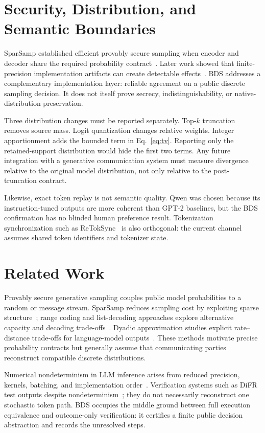 \documentclass[sigconf,review,nonacm]{acmart}
\begin{document}


\section{Security, Distribution, and Semantic Boundaries}
SparSamp established efficient provably secure sampling when encoder and decoder share the required probability contract~\cite{wang2025sparsamp}. Later work showed that finite-precision implementation artifacts can create detectable effects~\cite{cao2026finite}. BDS addresses a complementary implementation layer: reliable agreement on a public discrete sampling decision. It does not itself prove secrecy, indistinguishability, or native-distribution preservation.

Three distribution changes must be reported separately. Top-$k$ truncation removes source mass. Logit quantization changes relative weights. Integer apportionment adds the bounded term in Eq.~\eqref{eq:tv}. Reporting only the retained-support distribution would hide the first two terms. Any future integration with a generative communication system must measure divergence relative to the original model distribution, not only relative to the post-truncation contract.

Likewise, exact token replay is not semantic quality. Qwen was chosen because its instruction-tuned outputs are more coherent than GPT-2 baselines, but the BDS confirmation has no blinded human preference result. Tokenization synchronization such as ReTokSync~\cite{wang2026retoksync} is also orthogonal: the current channel assumes shared token identifiers and tokenizer state.

\section{Related Work}
Provably secure generative sampling couples public model probabilities to a random or message stream. SparSamp reduces sampling cost by exploiting sparse structure~\cite{wang2025sparsamp}; range coding and list-decoding approaches explore alternative capacity and decoding trade-offs~\cite{yan2026range,pang2026list}. Dyadic approximation studies explicit rate--distance trade-offs for language-model outputs~\cite{barlev2026dyadic}. These methods motivate precise probability contracts but generally assume that communicating parties reconstruct compatible discrete distributions.

Numerical nondeterminism in LLM inference arises from reduced precision, kernels, batching, and implementation order~\cite{yuan2025nondeterminism}. Verification systems such as DiFR test outputs despite nondeterminism~\cite{karvonen2025difr}; they do not necessarily reconstruct one stochastic token path. BDS occupies the middle ground between full execution equivalence and outcome-only verification: it certifies a finite public decision abstraction and records the unresolved steps.
\end{document}

